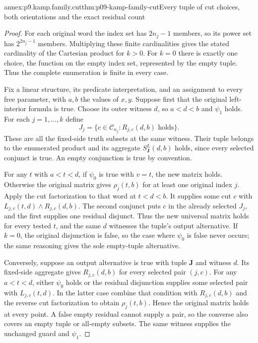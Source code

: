\begin{annexitem}{annex:p9.kamp.family.cut}{thm:p09-kamp-family-cut}{Every tuple of cut choices, both orientations and the exact residual count}
\begin{proof}
For each original word the index set has \(2n_j-1\) members,
so its power set has \(2^{2n_j-1}\) members. Multiplying these
finite cardinalities gives the stated cardinality of the Cartesian
product for \(k>0\). For \(k=0\) there is exactly one
choice, the function on the empty index set, represented by the
empty tuple. Thus the complete enumeration is finite in every case.

Fix a linear structure, its predicate interpretation, and an assignment
to every free parameter, with \(a,b\) the values of \(x,y\).
Suppose first that the original left-interior formula is true.
Choose its outer witness \(d\), so \(a<d<b\) and
\(\psi_1\) holds. For each \(j=1,\ldots,k\) define
\[
             J_j=\{c\in\mathcal C_{n_j}:R_{j,c}(d,b)\text{ holds}\}.
\]
These are all the fixed-side truth subsets at the same witness.
Their tuple belongs to the enumerated product and its aggregate
\(S_{\mathbf J}^L(d,b)\) holds, since every selected conjunct
is true. An empty conjunction is true by convention.

For any \(t\) with \(a<t<d\), if \(\psi_0\) is true
with \(v=t\), the new matrix holds. Otherwise the original
matrix gives \(\rho_j(t,b)\) for at least one original
index \(j\). Apply the cut factorization to that word at
\(t<d<b\). It supplies some cut \(c\) with
\(L_{j,c}(t,d)\land R_{j,c}(d,b)\).
The second conjunct puts \(c\) in the already selected
\(J_j\), and the first supplies one residual disjunct.
Thus the new universal matrix holds for every tested \(t\),
and the same \(d\) witnesses the tuple's output alternative.
If \(k=0\), the original disjunction is false, so the case
where \(\psi_0\) is false never occurs; the same reasoning
gives the sole empty-tuple alternative.

Conversely, suppose an output alternative is true with tuple
\(\mathbf J\) and witness \(d\). Its fixed-side aggregate
gives \(R_{j,c}(d,b)\) for every selected pair \((j,c)\).
For any \(a<t<d\), either \(\psi_0\) holds or the
residual disjunction supplies some selected pair with
\(L_{j,c}(t,d)\). In the latter case combine that condition
with \(R_{j,c}(d,b)\) and the reverse cut factorization to
obtain \(\rho_j(t,b)\). Hence the original matrix holds
at every point. A false empty residual cannot supply a pair,
so the converse also covers an empty tuple or all-empty subsets.
The same witness supplies the unchanged guard and \(\psi_1\).


\end{proof}
\end{annexitem}
